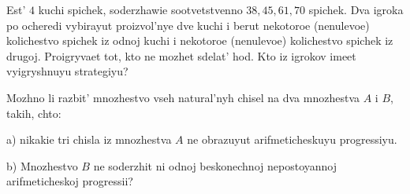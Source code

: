 \prob %
 Est' $4$ kuchi spichek, soderzhawie sootvet${}$stvenno  $ 38, 45, 61,
70$ spichek. Dva igroka po ocheredi vybirayut proizvol'nye dve kuchi
i berut nekotoroe (nenulevoe) kolichestvo spichek iz odnoj kuchi
i nekotoroe (nenulevoe) kolichestvo spichek iz drugoj. Proigryvaet
tot, kto ne mozhet sdelat' hod. Kto iz igrokov imeet vyigryshnuyu strategiyu?
                                     
                                                                      
                                                                      
                                             
            




\prob %
Mozhno li razbit' mnozhestvo vseh natural'nyh chisel na dva
mnozhestva                                                 $A$
i    $B$, 
takih, chto:
\item{a)} nikakie tri chisla iz mnozhestva                     $A$                            
ne obrazuyut arifmeticheskuyu progressiyu.
\item{b)} Mnozhestvo                                                           
   $B$ ne soderzhit ni odnoj beskonechnoj nepostoyannoj
arifmeticheskoj progressii?


\bye

